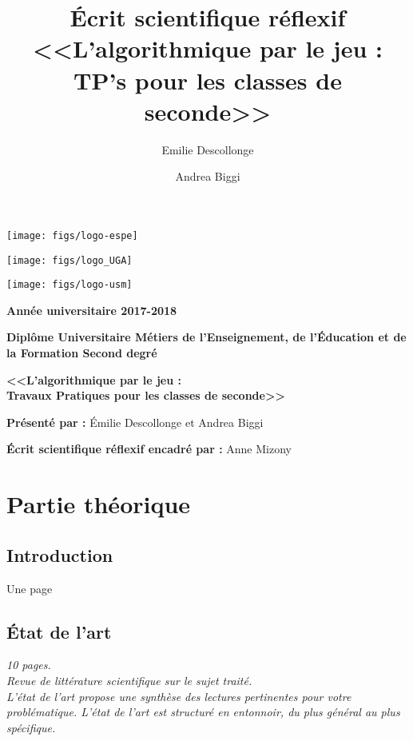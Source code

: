 \documentclass[a4paper, 12pt, appendixprefix=true]{scrreprt}%
\author{Emilie Descollonge \and Andrea Biggi}
\title{Écrit scientifique réflexif \\ \textbf{<<L'algorithmique par le jeu : TP's pour les classes de seconde>>}}
\date{}
\begin{document}
\begin{minipage}[c]{0.3\linewidth}
		\texttt{[image: figs/logo-espe]}
	\end{minipage}
	\hfill
\begin{minipage}[c]{0.3\linewidth}
		\texttt{[image: figs/logo\_UGA]}
	\end{minipage}
\begin{minipage}[c]{0.3\linewidth}
		\texttt{[image: figs/logo-usm]}
	\end{minipage}

\bigskip

\begin{center}
	{\large \textbf{Année universitaire 2017-2018}}
\end{center}

\bigskip


\begin{center}
	\textbf{Diplôme Universitaire Métiers de l'Enseignement, de l'Éducation et de la Formation Second degré}
\end{center}

\vspace{3cm}

\begin{center}
	{\LARGE \textbf{<<L'algorithmique par le jeu :\\
			 Travaux Pratiques pour les classes de seconde>>}}
\end{center}

\vspace{7cm}

\textbf{Présenté par :} Émilie Descollonge et Andrea Biggi

\textbf{Écrit scientifique réflexif encadré par :} Anne Mizony

\thispagestyle{empty}
\setcounter{page}{0}

\tableofcontents

\part{Partie théorique}
\chapter{Introduction}
Une page 

\chapter{État de l'art}
\textit{10 pages.\\
Revue de littérature scientifique sur le sujet traité.\\
L'état de l'art propose une synthèse des lectures pertinentes pour votre problématique. L'état de l'art est structuré en entonnoir, du plus général au plus spécifique.}\\
\end{document}

